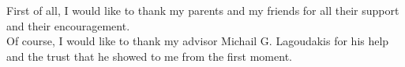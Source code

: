 \begin{acknowledgementslong}

\noindent
First of all, I would like to thank my parents and my friends for all their support and their encouragement.\\


\noindent
Of course, I would like to thank my advisor Michail G. Lagoudakis for his help and the trust that he showed to me from the first moment.\\


\end{acknowledgementslong}